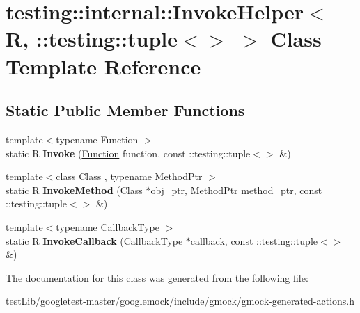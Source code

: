 \hypertarget{classtesting_1_1internal_1_1InvokeHelper_3_01R_00_01_1_1testing_1_1tuple_3_4_01_4}{}\section{testing\+:\+:internal\+:\+:Invoke\+Helper$<$ R, \+:\+:testing\+:\+:tuple$<$$>$ $>$ Class Template Reference}
\label{classtesting_1_1internal_1_1InvokeHelper_3_01R_00_01_1_1testing_1_1tuple_3_4_01_4}
\subsection*{Static Public Member Functions}
\begin{DoxyCompactItemize}
\item 
\mbox{\label{classtesting_1_1internal_1_1InvokeHelper_3_01R_00_01_1_1testing_1_1tuple_3_4_01_4_a55e6218235e69a896d88a3076a2c6150}} 
{\footnotesize template$<$typename Function $>$ }\\static R {\bfseries Invoke} (\hyperlink{structtesting_1_1internal_1_1Function}{Function} function, const \+::testing\+::tuple$<$$>$ \&)
\item 
\mbox{\label{classtesting_1_1internal_1_1InvokeHelper_3_01R_00_01_1_1testing_1_1tuple_3_4_01_4_a0368e26cbc1bcb12abbfb802f8294fa0}} 
{\footnotesize template$<$class Class , typename Method\+Ptr $>$ }\\static R {\bfseries Invoke\+Method} (Class $\ast$obj\+\_\+ptr, Method\+Ptr method\+\_\+ptr, const \+::testing\+::tuple$<$$>$ \&)
\item 
\mbox{\label{classtesting_1_1internal_1_1InvokeHelper_3_01R_00_01_1_1testing_1_1tuple_3_4_01_4_a9d81d455ebad0e8bf02a7d04c07ccb20}} 
{\footnotesize template$<$typename Callback\+Type $>$ }\\static R {\bfseries Invoke\+Callback} (Callback\+Type $\ast$callback, const \+::testing\+::tuple$<$$>$ \&)
\end{DoxyCompactItemize}


The documentation for this class was generated from the following file\+:\begin{DoxyCompactItemize}
\item 
test\+Lib/googletest-\/master/googlemock/include/gmock/gmock-\/generated-\/actions.\+h\end{DoxyCompactItemize}
